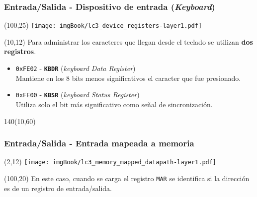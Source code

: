 \documentclass[aspectratio=169]{beamer}
\begin{document}
\begin{frame}[t,fragile]
    \frametitle{Entrada/Salida - Dispositivo de entrada (\emph{Keyboard})}
    \begin{textblock}{65}(100,25) \texttt{[image: imgBook/lc3\_device\_registers-layer1.pdf]} \end{textblock}
    \begin{textblock}{75}(10,12)
    Para administrar los caracteres que llegan desde el teclado se utilizan \textbf{dos registros}.\\
    \bigskip
    \begin{itemize}
     \item<2-> \textcolor{naranjauca}{\texttt{0xFE02}} - \textbf{\texttt{KBDR}} (\emph{keyboard Data Register})\\
     Mantiene en los 8 bits menos significativos el caracter que fue presionado.
     \item<3-> \textcolor{naranjauca}{\texttt{0xFE00}} - \textbf{\texttt{KBSR}} (\emph{keyboard Status Register})\\
     Utiliza solo el bit más significativo como señal de sincronización.
    \end{itemize}
    \end{textblock}
    \begin{textblock}{140}(10,60)
    \bigskip
    \end{textblock}
\end{frame}

\begin{frame}[t,fragile]
    \frametitle{Entrada/Salida - Entrada mapeada a memoria}
    \begin{textblock}{65}(2,12) \texttt{[image: imgBook/lc3\_memory\_mapped\_datapath-layer1.pdf]} \end{textblock}
    \begin{textblock}{50}(100,20)
    En este caso, cuando se carga el registro \texttt{MAR} \textcolor{verdeuca}{se identifica si la dirección es de un registro de entrada/salida.}\\
    \bigskip
    \end{textblock}
\end{frame}
\end{document}
